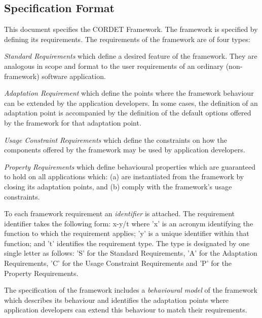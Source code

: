 \documentclass[a4paper,10pt]{article}
\newenvironment{fw_itemize}						%
{\begin{itemize}
  \setlength{\itemsep}{1mm}
  \setlength{\parskip}{0pt}
  \setlength{\parsep}{0pt}}
{\end{itemize}}
\begin{document}
\subsection{Specification Format}\label{sec:SpecFormat} 

This document specifies the CORDET Framework. 
The framework is specified by defining its requirements. 
The requirements of the framework are of four types:

\begin{fw_itemize}
\item{} \textit{Standard Requirements} which define a desired feature of the framework. 
They are analogous in scope and format to the user requirements of an ordinary (non-framework) software application.
\item{} \textit{Adaptation Requirement} which define the points where the framework behaviour can be extended by the application developers. 
In some cases, the definition of an adaptation point is accompanied by the definition of the default options offered by the framework for that adaptation point.  
\item{} \textit{Usage Constraint Requirements} which define the constraints on how the components offered by the framework may be used by application developers.
\item{} \textit{Property Requirements} which define behavioural properties which are guaranteed to hold on all applications which: (a) are instantiated from the framework by closing its adaptation points, and (b) comply with the framework's usage constraints.
\end{fw_itemize}

To each framework requirement an \textit{identifier} is attached.
The requirement identifier takes the following form: x-y/t where 'x' is an acronym identifying the function to which the requirement applies; 'y' is a unique identifier within that function; and 't' identifies the requirement type. 
The type is designated by one single letter as follows: 'S' for the Standard Requirements, 'A' for the Adaptation Requirements, 'C' for the Usage Constraint Requirements and 'P' for the Property Requirements.

The specification of the framework includes a \textit{behavioural model} of the framework which describes its behaviour and identifies the adaptation points where application developers can extend this behaviour to match their requirements.  
\end{document}
